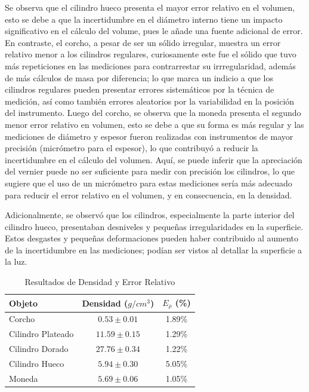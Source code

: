 Se observa que el cilindro hueco presenta el mayor error relativo en el 
volumen, esto se debe a que la incertidumbre en el diámetro interno 
tiene un impacto significativo en el cálculo del volume, pues le añade 
una fuente adicional de error. En contraste, el corcho, a pesar de ser un 
sólido irregular, muestra un error relativo menor a los cilindros regulares, 
curiosamente este fue el sólido que tuvo más repeticiones en las mediciones para 
contrarrestar su irrregularidad, además de más cálculos de masa por diferencia; 
lo que marca un indicio a que los cilindros regulares pueden presentar
errores sistemáticos por la técnica de medición, así como también errores
aleatorios por la variabilidad en la posición del instrumento.
Luego del corcho, se observa que la moneda presenta el segundo menor error 
relativo en volumen, esto se debe a que su forma es más regular y 
las mediciones de diámetro y espesor fueron realizadas con
instrumentos de mayor precisión (micrómetro para el espesor),
lo que contribuyó a reducir la incertidumbre en el cálculo del volumen.
Aquí, se puede inferir que la apreciación del vernier puede no ser 
suficiente para medir con precisión los cilindros, lo que sugiere que 
el uso de un micrómetro para estas mediciones sería más adecuado 
para reducir el error relativo en el volumen, y en consecuencia, en la densidad.

Adicionalmente, se observó que los cilindros, especialmente la parte interior 
del cilindro hueco, presentaban desniveles y pequeñas irregularidades en la 
superficie.
Estos desgastes y pequeñas deformaciones pueden haber contribuido al aumento 
de la incertidumbre en las mediciones; podían ser vistos al detallar la
superficie a la luz.

\begin{table}[h!]
\centering
\caption{Resultados de Densidad y Error Relativo}
\label{tab:densidad}
    \begin{tabular}{lcc}
    \toprule
    Objeto & Densidad ($g/cm^3$) & $E_{\rho}$ (\%) \\
    \midrule
    Corcho & $0.53 \pm 0.01$ & 1.89\% \\
    Cilindro Plateado & $11.59 \pm 0.15$ & 1.29\% \\
    Cilindro Dorado & $27.76 \pm 0.34$ & 1.22\% \\
    Cilindro Hueco & $5.94 \pm 0.30$ & 5.05\% \\
    Moneda & $5.69 \pm 0.06$ & 1.05\% \\
    \bottomrule
    \end{tabular}
\end{table}

